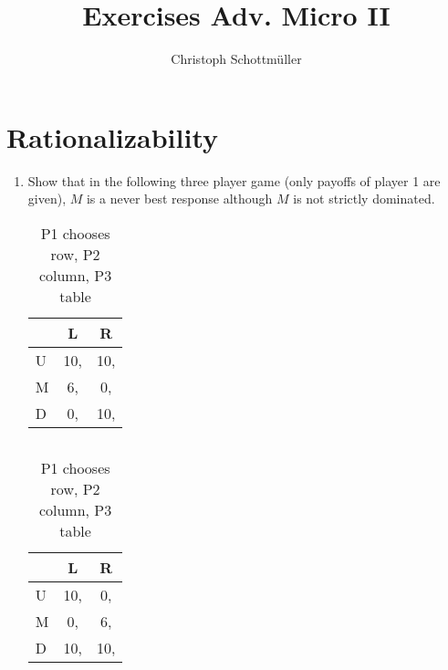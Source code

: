 \documentclass[a4paper,12pt]{article}
\title{Exercises Adv. Micro II}
\author{Christoph Schottm\"uller}
\begin{document}
\maketitle

\section{Rationalizability}
\begin{enumerate}
\item %
  Show that in the following three player game (only payoffs of player 1 are given), $M$ is a never best response although $M$ is not strictly dominated.
\begin{table}[h]
    \centering
    \begin{tabular}{l|c|c}
      & L &R\\ \hline
      U& 10,  &10, \\
      M&6,  &0, \\
      D& 0, & 10,
    \end{tabular}
    $\qquad$
    \begin{tabular}{l|c|c}
      & L &R\\ \hline
      U& 10,  &0,  \\
      M&0,&6, \\
      D& 10, & 10,
    \end{tabular}
    \caption{P1 chooses row, P2 column, P3 table}
    \label{tab:domVsRatio}
  \end{table}
  

\end{enumerate}
\end{document}
